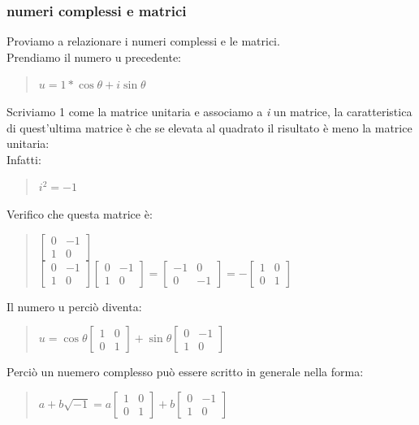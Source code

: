 \documentclass[a4paper]{article}
\begin{document}
\subsubsection{numeri complessi e matrici}
Proviamo a relazionare i numeri complessi e le matrici.
\\Prendiamo il numero u precedente:
\begin{quote} \centering$u=1*\cos\theta+\textit{i}\sin\theta
$\end{quote}
Scriviamo 1 come la matrice unitaria e associamo a \textit{i} un matrice, la caratteristica di quest'ultima matrice è che se elevata al quadrato il risultato è meno la matrice unitaria:
\\Infatti:
\begin{quote} \centering $\textit{i}^2=-1
$\end{quote}
Verifico che questa matrice è:
\begin{quote} \centering $\left[\begin{matrix}0&-1\\ 1&0 \end{matrix}\right]
$
\bigskip \\
$\left[\begin{matrix}0&-1\\ 1&0 \end{matrix}\right]
\left[\begin{matrix}0&-1\\ 1&0 \end{matrix}\right]
= \left[\begin{matrix}-1&0 \\ 0&-1 \end{matrix}\right]
=-\left[\begin{matrix}1&0 \\ 0&1 \end{matrix}\right]
$\end{quote}
Il numero u perciò diventa:
\begin{quote} \centering$u=\cos\theta\left[\begin{matrix}1&0 \\ 0&1 \end{matrix}\right]+\sin\theta\left[\begin{matrix}0&-1\\ 1&0 \end{matrix}\right]
$\end{quote}
Perciò un nuemero complesso può essere scritto in generale nella forma:
\begin{quote} \centering $a+b\sqrt{-1}=a \left[\begin{matrix}1&0 \\ 0&1 \end{matrix}\right]+ b\left[\begin{matrix}0&-1\\ 1&0 \end{matrix}\right]
$\end{quote}
\end{document}
